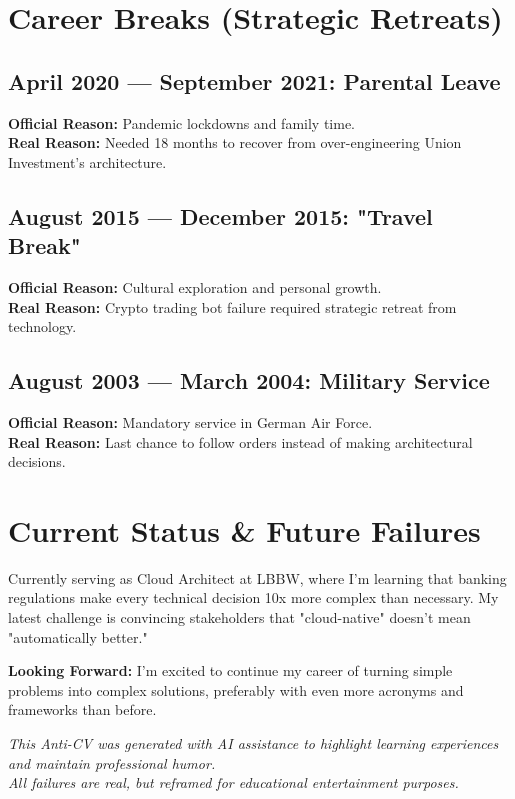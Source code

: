 \documentclass[10pt,a4paper]{article}
\begin{document}
\section*{Career Breaks (Strategic Retreats)}

\subsection*{April 2020 — September 2021: Parental Leave}
\textbf{Official Reason:} Pandemic lockdowns and family time.\\
\textbf{Real Reason:} Needed 18 months to recover from over-engineering Union Investment's architecture.

\subsection*{August 2015 — December 2015: "Travel Break"}
\textbf{Official Reason:} Cultural exploration and personal growth.\\
\textbf{Real Reason:} Crypto trading bot failure required strategic retreat from technology.

\subsection*{August 2003 — March 2004: Military Service}
\textbf{Official Reason:} Mandatory service in German Air Force.\\
\textbf{Real Reason:} Last chance to follow orders instead of making architectural decisions.

\section*{Current Status \& Future Failures}

Currently serving as Cloud Architect at LBBW, where I'm learning that banking regulations make every technical decision 10x more complex than necessary. My latest challenge is convincing stakeholders that "cloud-native" doesn't mean "automatically better."

\textbf{Looking Forward:} I'm excited to continue my career of turning simple problems into complex solutions, preferably with even more acronyms and frameworks than before.

\vfill
\begin{center}
{\footnotesize\color{lessongray} \textit{This Anti-CV was generated with AI assistance to highlight learning experiences and maintain professional humor.}}\\
{\footnotesize\color{lessongray} \textit{All failures are real, but reframed for educational entertainment purposes.}}
\end{center}
\end{document}
